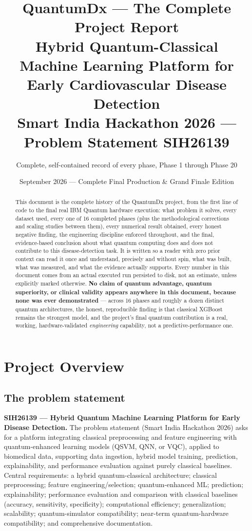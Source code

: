 \documentclass[11pt,a4paper]{article}
\title{\textbf{QuantumDx --- The Complete Project Report}\\[0.3em]
\large Hybrid Quantum-Classical Machine Learning Platform for Early Cardiovascular Disease Detection\\[0.2em]
\normalsize Smart India Hackathon 2026 --- Problem Statement SIH26139}
\author{Complete, self-contained record of every phase, Phase 1 through Phase 20}
\date{September 2026 --- Complete Final Production \& Grand Finale Edition}
\begin{document}
\maketitle
\thispagestyle{empty}

\begin{abstract}
\noindent This document is the complete history of the QuantumDx project, from the first line of code to the final real IBM Quantum hardware execution: what problem it solves, every dataset used, every one of 16 completed phases (plus the methodological corrections and scaling studies between them), every numerical result obtained, every honest negative finding, the engineering discipline enforced throughout, and the final, evidence-based conclusion about what quantum computing does and does not contribute to this disease-detection task. It is written so a reader with zero prior context can read it once and understand, precisely and without spin, what was built, what was measured, and what the evidence actually supports. Every number in this document comes from an actual executed run persisted to disk, not an estimate, unless explicitly marked otherwise. \textbf{No claim of quantum advantage, quantum superiority, or clinical validity appears anywhere in this document, because none was ever demonstrated} --- across 16 phases and roughly a dozen distinct quantum architectures, the honest, reproducible finding is that classical XGBoost remains the strongest model, and the project's final quantum contribution is a real, working, hardware-validated \emph{engineering} capability, not a predictive-performance one.
\end{abstract}

\tableofcontents
\newpage

\section{Project Overview}

\subsection{The problem statement}

\textbf{SIH26139 --- Hybrid Quantum Machine Learning Platform for Early Disease Detection.} The problem statement (Smart India Hackathon 2026) asks for a platform integrating classical preprocessing and feature engineering with quantum-enhanced learning models (QSVM, QNN, or VQC), applied to biomedical data, supporting data ingestion, hybrid model training, prediction, explainability, and performance evaluation against purely classical baselines. Central requirements: a hybrid quantum-classical architecture; classical preprocessing; feature engineering/selection; quantum-enhanced ML; prediction; explainability; performance evaluation and comparison with classical baselines (accuracy, sensitivity, specificity); computational efficiency; generalization; scalability; quantum-simulator compatibility; near-term quantum-hardware compatibility; and comprehensive documentation.
\end{document}
